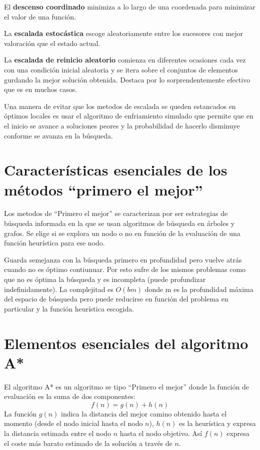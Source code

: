 \documentclass[12pt]{article}
\begin{document}
El \textbf{descenso coordinado} minimiza a lo largo de una coordenada
para minimizar el valor de una función.

La \textbf{escalada estocástica} escoge aleatoriamente entre los
sucesores con mejor valoración que el estado actual.

La \textbf{escalada de reinicio aleatorio} comienza en diferentes
ocasiones cada vez con una condición inicial aleatoria y se itera
sobre el conjuntos de elementos gurdando la mejor solución obtenida.
Destaca por lo sorprendentemente efectivo que es en muchos casos.

Una manera de evitar que los metodos de escalada se queden estancados
en óptimos locales es usar el algoritmo de enfriamiento simulado que
permite que en el inicio se avance a soluciones peores y la
probabilidad de hacerlo disminuye conforme se avanza en la búsqueda.


\section{Características esenciales de los métodos “primero el mejor”}

Los metodos de ``Primero el mejor'' se caracterizan por ser
estrategias de búsqueda informada en la que se usan algoritmos de
búsqueda en árboles y grafos. Se elige si se explora un nodo o no en
función de la evaluación de una función heurística para ese nodo.

Guarda semejanza con la búsqueda primero en profundidad pero vuelve
atrás cuando no es óptimo contiunuar. Por esto sufre de los mismos
problemas como que no es óptima la búsqueda y es incompleta (puede
profundizar indefinidamente). La complejitad es $O(bm)$ donde m es la
profundidad máxima del espacio de búsqueda pero puede reducirse en
función del problema en particular y la función heurística escogida.

\section{Elementos esenciales del algoritmo A*}

El algoritmo A* es un algoritmo se tipo ``Primero el mejor'' donde la
función de evaluación es la suma de dos componentes:$$f(n)=g(n)+h(n)$$
La función $g(n)$ indica la distancia del mejor camino obtenido hasta
el momento (desde el nodo inicial hasta el nodo $n$), $h(n)$ es la
heurística y expresa la distancia estimada entre el nodo $n$ hasta el
nodo objetivo. Así $f(n)$ expresa el coste más barato estimado de la
solución a través de $n$.
\end{document}
